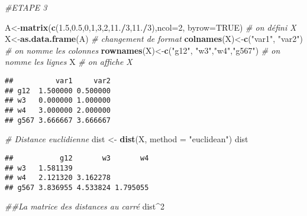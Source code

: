 \documentclass[
]{article}
\newenvironment{Shaded}{\begin{snugshade}}{\end{snugshade}}
\newcommand{\CommentTok}[1]{\textcolor[rgb]{0.56,0.35,0.01}{\textit{#1}}}
\newcommand{\DataTypeTok}[1]{\textcolor[rgb]{0.13,0.29,0.53}{#1}}
\newcommand{\DecValTok}[1]{\textcolor[rgb]{0.00,0.00,0.81}{#1}}
\newcommand{\FloatTok}[1]{\textcolor[rgb]{0.00,0.00,0.81}{#1}}
\newcommand{\KeywordTok}[1]{\textcolor[rgb]{0.13,0.29,0.53}{\textbf{#1}}}
\newcommand{\NormalTok}[1]{#1}
\newcommand{\OperatorTok}[1]{\textcolor[rgb]{0.81,0.36,0.00}{\textbf{#1}}}
\newcommand{\OtherTok}[1]{\textcolor[rgb]{0.56,0.35,0.01}{#1}}
\newcommand{\StringTok}[1]{\textcolor[rgb]{0.31,0.60,0.02}{#1}}
\begin{document}
\begin{Shaded}
\begin{Highlighting}[]
\CommentTok{#ETAPE 3}

\NormalTok{A<-}\KeywordTok{matrix}\NormalTok{(}\KeywordTok{c}\NormalTok{(}\FloatTok{1.5}\NormalTok{,}\FloatTok{0.5}\NormalTok{,}\DecValTok{0}\NormalTok{,}\DecValTok{1}\NormalTok{,}\DecValTok{3}\NormalTok{,}\DecValTok{2}\NormalTok{,}\FloatTok{11.}\OperatorTok{/}\DecValTok{3}\NormalTok{,}\FloatTok{11.}\OperatorTok{/}\DecValTok{3}\NormalTok{),}\DataTypeTok{ncol=}\DecValTok{2}\NormalTok{, }\DataTypeTok{byrow=}\OtherTok{TRUE}\NormalTok{) }\CommentTok{# on défini X}
\NormalTok{X<-}\KeywordTok{as.data.frame}\NormalTok{(A) }\CommentTok{# changement de format}
\KeywordTok{colnames}\NormalTok{(X)<-}\KeywordTok{c}\NormalTok{(}\StringTok{"var1"}\NormalTok{, }\StringTok{"var2"}\NormalTok{) }\CommentTok{# on nomme les colonnes}
\KeywordTok{rownames}\NormalTok{(X)<-}\KeywordTok{c}\NormalTok{(}\StringTok{"g12"}\NormalTok{, }\StringTok{"w3"}\NormalTok{,}\StringTok{"w4"}\NormalTok{,}\StringTok{"g567"}\NormalTok{) }\CommentTok{# on nomme les lignes}
\NormalTok{X }\CommentTok{# on affiche X}
\end{Highlighting}
\end{Shaded}

\begin{verbatim}
##          var1     var2
## g12  1.500000 0.500000
## w3   0.000000 1.000000
## w4   3.000000 2.000000
## g567 3.666667 3.666667
\end{verbatim}

\begin{Shaded}
\begin{Highlighting}[]
\CommentTok{# Distance euclidienne}
\NormalTok{dist <-}\StringTok{ }\KeywordTok{dist}\NormalTok{(X, }\DataTypeTok{method =} \StringTok{"euclidean"}\NormalTok{)}
\NormalTok{dist}
\end{Highlighting}
\end{Shaded}

\begin{verbatim}
##           g12       w3       w4
## w3   1.581139                  
## w4   2.121320 3.162278         
## g567 3.836955 4.533824 1.795055
\end{verbatim}

\begin{Shaded}
\begin{Highlighting}[]
\CommentTok{##La matrice des distances au carré}
\NormalTok{dist}\OperatorTok{^}\DecValTok{2}
\end{Highlighting}
\end{Shaded}
\end{document}

